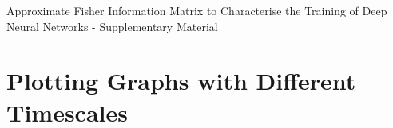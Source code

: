\documentclass[10pt,journal,compsoc]{IEEEtran}
\begin{document}
{\small


}

\newpage
\onecolumn

\begin{center}
\textup{\Huge Approximate Fisher Information Matrix to Characterise the Training of Deep Neural Networks - Supplementary Material}
\end{center}

\vspace{20mm}
\setcounter{section}{0}

\section{Plotting Graphs with Different Timescales}%
\end{document}
